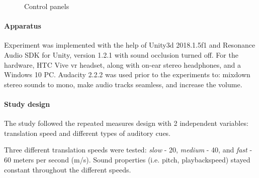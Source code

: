 \begin{figure}
	\centering

	
	\caption{Control panels}
	\label{fig:pilot1controlpanel}
\end{figure}


\paragraph{Apparatus}
Experiment was implemented with the help of Unity3d  2018.1.5f1 and Resonance Audio SDK for Unity, version 1.2.1 with sound occlusion turned off. For the hardware, HTC Vive \gls{vr} headset, along with on-ear stereo headphones, and a Windows 10 PC.
Audacity 2.2.2 was used prior to the experiments to: mixdown stereo sounds to mono, make audio tracks seamless, and increase the volume.

\paragraph{Study design}
The study followed the repeated measures design with 2 independent variables: translation speed and different types of auditory cues.

Three different translation speeds were tested: \textit{slow} - 20, \textit{medium }- 40, and \textit{fast }- 60 meters per second (m/s). Sound properties (i.e. pitch, playbackspeed) stayed constant throughout the different speeds.

